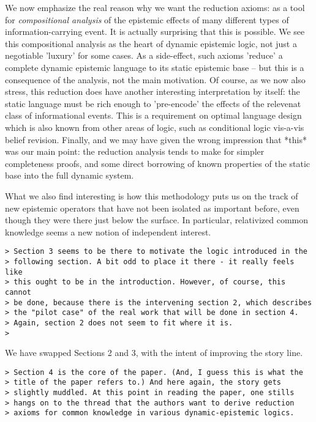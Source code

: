 \documentclass{article}
\begin{document}
We now emphasize the real reason why we want the reduction axioms:
as a tool for {\em compositional analysis} of the epistemic effects of
many different types of information-carrying event. It is actually
surprising that this is possible. We see this compositional analysis
as the heart of dynamic epistemic logic, not just a negotiable
'luxury' for some cases. As a side-effect, such axioms
'reduce' a complete dynamic epistemic language to its static
epistemic base -- but this is a consequence of the analysis,
not the main motivation. Of course, as we now also stress, this
reduction does have another interesting interpretation by itself:
the static language must be rich enough to 'pre-encode' the
effects of the relevenat class of informational events. This
is a requirement on optimal language design which is also known
from other areas of logic, such as conditional logic vis-a-vis
belief revision. Finally, and we may have given the wrong
impression that *this* was our main point: the reduction
analysis tends to make for simpler completeness proofs,
and some direct borrowing of known properties of the
static base into the full dynamic system.

What we also find interesting is how this methodology puts us on
the track of new epistemic operators that have not been isolated
as important before, even though they were there just below the
surface. In particular, relativized common knowledge seems a
new notion of independent interest.

\begin{verbatim}
> Section 3 seems to be there to motivate the logic introduced in the
> following section. A bit odd to place it there - it really feels like
> this ought to be in the introduction. However, of course, this cannot
> be done, because there is the intervening section 2, which describes
> the "pilot case" of the real work that will be done in section 4.
> Again, section 2 does not seem to fit where it is.
>
\end{verbatim}

We have swapped Sections 2 and 3, with the intent of improving the
story line.

\begin{verbatim}
> Section 4 is the core of the paper. (And, I guess this is what the
> title of the paper refers to.) And here again, the story gets
> slightly muddled. At this point in reading the paper, one stills
> hangs on to the thread that the authors want to derive reduction
> axioms for common knowledge in various dynamic-epistemic logics.
\end{verbatim} 
\end{document}

